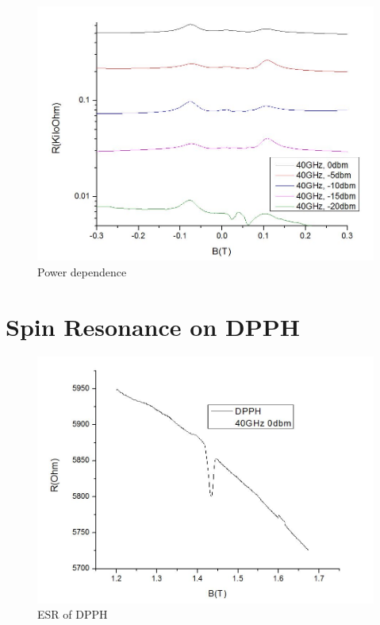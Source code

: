 \documentclass[12pt]{ruthesis}
\begin{document}
 
\begin{figure}
  \centering
  \includegraphics[totalheight=8cm]{figures/thermopowerdep.JPG}
  \caption{Power dependence}
  \label{thermopowerdep}
\end{figure}
 






\section{Spin Resonance on DPPH}\label{DPPH}


\begin{figure}
  \centering
  \includegraphics[totalheight=8cm]{figures/dpph_esr.JPG}
  \caption{ESR of DPPH}
  \label{dpph_esr}
\end{figure}
 
\end{document}
